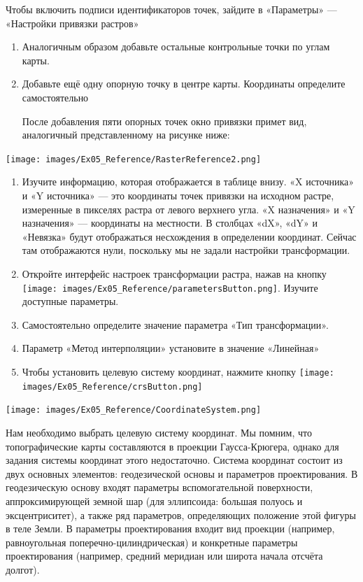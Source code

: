 \documentclass[
  12pt,
]{book}
\begin{document}
Чтобы включить подписи идентификаторов точек, зайдите в «Параметры» --- «Настройки привязки растров»

\begin{enumerate}
\def\labelenumi{\arabic{enumi}.}
\setcounter{enumi}{7}
\item
  Аналогичным образом добавьте остальные контрольные точки по углам карты.
\item
  Добавьте ещё одну опорную точку в центре карты. Координаты определите самостоятельно

  После добавления пяти опорных точек окно привязки примет вид, аналогичный представленному на рисунке ниже:
\end{enumerate}

\texttt{[image: images/Ex05\_Reference/RasterReference2.png]}

\begin{enumerate}
\def\labelenumi{\arabic{enumi}.}
\setcounter{enumi}{9}
\item
  Изучите информацию, которая отображается в таблице внизу. «X источника» и «Y источника» --- это координаты точек привязки на исходном растре, измеренные в пикселях растра от левого верхнего угла. «X назначения» и «Y назначения» --- координаты на местности. В столбцах «dX», «dY» и «Невязка» будут отображаться несхождения в определении координат. Сейчас там отображаются нули, поскольку мы не задали настройки трансформации.
\item
  Откройте интерфейс настроек трансформации растра, нажав на кнопку \texttt{[image: images/Ex05\_Reference/parametersButton.png]}. Изучите доступные параметры.
\item
  Самостоятельно определите значение параметра «Тип трансформации».
\item
  Параметр «Метод интерполяции» установите в значение «Линейная»
\item
  Чтобы установить целевую систему координат, нажмите кнопку \texttt{[image: images/Ex05\_Reference/crsButton.png]}
\end{enumerate}

\texttt{[image: images/Ex05\_Reference/CoordinateSystem.png]}

Нам необходимо выбрать целевую систему координат. Мы помним, что топографические карты составляются в проекции Гаусса-Крюгера, однако для задания системы координат этого недостаточно. Система координат состоит из двух основных элементов: геодезической основы и параметров проектирования. В геодезическую основу входят параметры вспомогательной поверхности, аппроксимирующей земной шар (для эллипсоида: большая полуось и эксцентриситет), а также ряд параметров, определяющих положение этой фигуры в теле Земли. В параметры проектирования входит вид проекции (например, равноугольная поперечно-цилиндрическая) и конкретные параметры проектирования (например, средний меридиан или широта начала отсчёта долгот).
\end{document}
